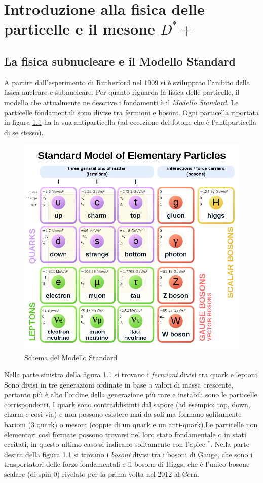 \chapter{Introduzione alla fisica delle particelle e il mesone $D^*+$ }

\section{La fisica subnucleare e il Modello Standard}
A partire dall'esperimento di Rutherford nel 1909 si è sviluppato l'ambito della fisica nucleare e subnucleare. Per quanto riguarda la fisica delle particelle, il modello che attualmente ne descrive i fondamenti è il \textit{Modello Standard}. Le particelle fondamentali sono divise tra fermioni e bosoni. Ogni particella riportata in figura \ref{fig:ModelloStandard} ha la sua antiparticella (ad eccezione del fotone che è l'antiparticella di se stesso). 

    \begin{figure}[htbp]
        \centering
        \includegraphics[width=0.65\linewidth]{introParticelle/ModelloStandard.png}
        \caption{Schema del Modello Standard}
        \label{fig:ModelloStandard}
    \end{figure}
    
Nella parte sinistra della figura \ref{fig:ModelloStandard} si trovano i \textit{fermioni} divisi tra quark e leptoni. Sono divisi in tre generazioni ordinate in base a valori di massa crescente, pertanto più è alto l'ordine della generazione più rare e instabili sono le particelle corrispondenti. I quark sono contraddistinti dal sapore (ad esempio: top, down, charm e così via) e non possono esistere mai da soli ma formano solitamente barioni (3 quark) o mesoni (coppie di un quark e un anti-quark).Le particelle non elementari così formate possono trovarsi nel loro stato fondamentale o in stati eccitati, in questo ultimo caso si indicano solitamente con l'apice $^*$. \cite{libro_nucleare}
Nella parte destra della figura \ref{fig:ModelloStandard} si trovano i \textit{bosoni} divisi tra i bosoni di Gauge, che sono i trasportatori delle forze fondamentali e il bosone di Higgs, che è l'unico bosone scalare (di spin 0) rivelato per la prima volta nel 2012 al Cern.

